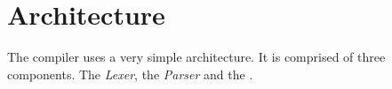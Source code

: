 \section{Architecture}
\label{sec:architecture}

The \lang compiler uses a very simple architecture. It is comprised of three
components. The \textit{Lexer}, the \textit{Parser} and the \textit{}.
